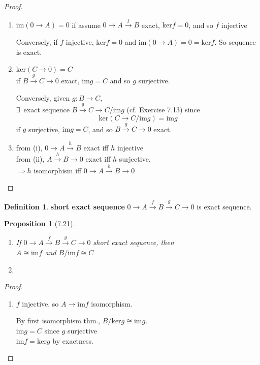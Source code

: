 \documentclass[twoside,landscape]{amsart}
\theoremstyle{plain}
\newtheorem{proposition}{Proposition}
\theoremstyle{definition}
\newtheorem{definition}{Definition}
\theoremstyle{remark}
\begin{document}
\begin{multicols*}{2}
\begin{proof}
  \begin{enumerate}
    \item[(i)] $\text{im}(0\to A) =0$ 
if assume $0 \to A \xrightarrow{f} B$ exact, $\text{ker}{f} =0$, and so $f$ injective

Conversely, if $f$ injective, $\text{ker}f=0$ and $\text{im}(0\to A)=0 = \text{ker}f$.  So sequence is exact.  
    \item[(ii)] $\text{ker}(C\to 0) = C$ \\
if $B\xrightarrow{g} C \to 0$ exact, $\text{im}g = C$ and so $g$ surjective.  

Conversely, given $g: B \to C$, \\
\phantom{Conversely} $\exists \, $ exact sequence $B \xrightarrow{g} C \to C/\text{im}g$ (cf. Exercise 7.13) since
\[
\text{ker}(C\to C/\text{im}g) = \text{im}g
\]
if $g$ surjective, $\text{im}g =C$, and so $B\xrightarrow{g}C \to 0$ exact.
    \item[(iii)] from (i), $0 \to A \xrightarrow{h} B$ exact iff $h$ injective \\
from (ii), $A \xrightarrow{h} B \to 0$ exact iff $h$ surjective.  \\
$\Longrightarrow  h$ isomorphism iff $0 \to A \xrightarrow{h} B \to 0$
\end{enumerate}
\end{proof}

\begin{definition}
  \textbf{short exact sequence } $0 \to A \xrightarrow{f} B \xrightarrow{g} C \to 0$ is exact sequence. 
\end{definition}

\begin{proposition}[7.21]
  \begin{enumerate}
\item[(i)] If $0 \to A \xrightarrow{f} B \xrightarrow{g} C \to 0$ short exact sequence, then \\
$A \cong \text{im}f$ and $B/\text{im}f \cong C$
\item[(ii)]
\end{enumerate}
\end{proposition}

\begin{proof}
  \begin{enumerate}
    \item[(i)] $f$ injective, so $A \to \text{im}f$ isomorphism.  

By first isomorphism thm., $B/\text{ker}g \cong \text{im}g$.  \\
$\text{im}g = C$ since $g$ surjective \\
$\text{im}f = \text{ker}g$ by exactness.  


\end{enumerate}
\end{proof}
\end{multicols*}
\end{document}
